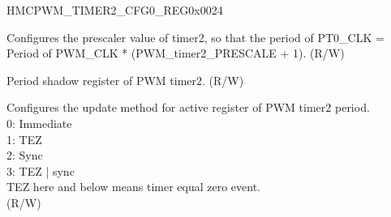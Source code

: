 \begin{register}{H}{MCPWM\_TIMER2\_CFG0\_REG}{0x0024}\label{regdesc:MCPWMTIMER2CFG0REG}
%
%
%
%
\regnewline%
\begin{regdesc}\begin{reglist}
\label{fielddesc:MCPWMTIMER2PRESCALE}\item [MCPWM\_TIMER2\_PRESCALE] Configures the prescaler value of timer2, so that the period of PT0\_CLK = Period of PWM\_CLK * (PWM\_timer2\_PRESCALE + 1). (R/W)
\label{fielddesc:MCPWMTIMER2PERIOD}\item [MCPWM\_TIMER2\_PERIOD] Period shadow register of PWM timer2. (R/W)
\label{fielddesc:MCPWMTIMER2PERIODUPMETHOD}\item [MCPWM\_TIMER2\_PERIOD\_UPMETHOD] Configures the update method for active register of PWM timer2 period.
\\0: Immediate
\\1: TEZ
\\2: Sync
\\3: TEZ | sync
\\TEZ here and below means timer equal zero event.
\\(R/W)
\end{reglist}\end{regdesc}
\end{register}



